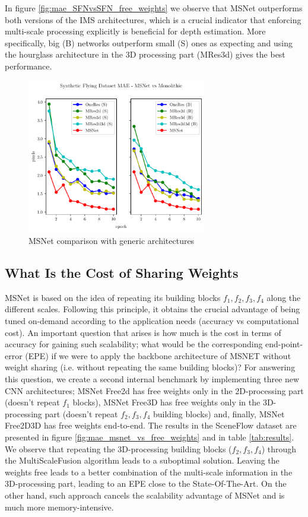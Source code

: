 \documentclass[runningheads]{llncs}
\begin{document}
In figure \ref{fig:mae_SFNvsSFN_free_weights} we observe that MSNet outperforms both versions of the IMS architectures, which is a crucial indicator that enforcing multi-scale processing explicitly is beneficial for depth estimation. More specifically, big (B) networks outperform small (S) ones as expecting and using the hourglass architecture in the 3D processing part (MRes3d) gives the best performance.

\begin{figure}[t]
    \centering
    \includegraphics[width=0.7\textwidth]{figures/freiburg_msnet_vs_monolithic_mae.pdf}
    \caption{MSNet comparison with generic architectures}
    \label{fig:mae_SFNvsGenericNets}
\end{figure}

\subsection{What Is the Cost of Sharing Weights}

MSNet is based on the idea of repeating its building blocks $f_1, f_2, f_3, f_4$ along the different scales. Following this principle, it obtains the crucial advantage of being tuned on-demand according to the application needs (accuracy vs computational cost). An important question that arises is how much is the cost in terms of accuracy for gaining such scalability; what would be the corresponding end-point-error (EPE) if we were to apply the backbone architecture of MSNET without weight sharing (i.e. without repeating the same building blocks)? For answering this question, we create a second internal benchmark by implementing three new CNN architectures; MSNet Free2d has free weights only in the 2D-processing part (doesn't repeat $f_1$ blocks), MSNet Free3D has free weights only in the 3D-processing part (doesn't repeat $f_2, f_3, f_4$ building blocks) and, finally, MSNet Free2D3D has free weights end-to-end. The results in the SceneFlow dataset are presented in figure \ref{fig:mae_msnet_vs_free_weights} and in table \ref{tab:results}. We observe that repeating the 3D-processing building blocks ($f_2, f_3, f_4$) through the MultiScaleFusion algorithm leads to a suboptimal solution. Leaving the weights free leads to a better combination of the multi-scale information in the 3D-processing part, leading to an EPE close to the State-Of-The-Art. On the other hand, such approach cancels the scalability advantage of MSNet and is much more memory-intensive.
\end{document}
